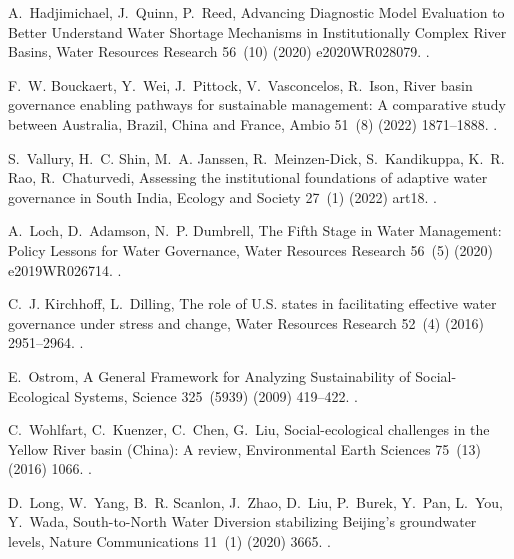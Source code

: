 \documentclass[preprint, 12pt]{elsarticle}
\begin{document}
\begin{thebibliography}{10}
A.~Hadjimichael, J.~Quinn, P.~Reed, Advancing {{Diagnostic Model Evaluation}}
  to {{Better Understand Water Shortage Mechanisms}} in {{Institutionally
  Complex River Basins}}, Water Resources Research 56~(10) (2020)
  e2020WR028079.
\newblock \href {http://dx.doi.org/10.1029/2020WR028079}
  {}.

F.~W. Bouckaert, Y.~Wei, J.~Pittock, V.~Vasconcelos, R.~Ison, River basin
  governance enabling pathways for sustainable management: {{A}} comparative
  study between {{Australia}}, {{Brazil}}, {{China}} and {{France}}, Ambio
  51~(8) (2022) 1871--1888.
\newblock \href {http://dx.doi.org/10.1007/s13280-021-01699-4}
  {}.

S.~Vallury, H.~C. Shin, M.~A. Janssen, R.~{Meinzen-Dick}, S.~Kandikuppa, K.~R.
  Rao, R.~Chaturvedi, Assessing the institutional foundations of adaptive water
  governance in {{South India}}, Ecology and Society 27~(1) (2022) art18.
\newblock \href {http://dx.doi.org/10.5751/ES-12957-270118}
  {}.

A.~Loch, D.~Adamson, N.~P. Dumbrell, The {{Fifth Stage}} in {{Water
  Management}}: {{Policy Lessons}} for {{Water Governance}}, Water Resources
  Research 56~(5) (2020) e2019WR026714.
\newblock \href {http://dx.doi.org/10.1029/2019WR026714}
  {}.

C.~J. Kirchhoff, L.~Dilling, The role of {{U}}.{{S}}. states in facilitating
  effective water governance under stress and change, Water Resources Research
  52~(4) (2016) 2951--2964.
\newblock \href {http://dx.doi.org/10.1002/2015WR018431}
  {}.

E.~Ostrom, A {{General Framework}} for {{Analyzing Sustainability}} of
  {{Social-Ecological Systems}}, Science 325~(5939) (2009) 419--422.
\newblock \href {http://dx.doi.org/10.1126/science.1172133}
  {}.

C.~Wohlfart, C.~Kuenzer, C.~Chen, G.~Liu, Social-ecological challenges in the
  {{Yellow River}} basin ({{China}}): A review, Environmental Earth Sciences
  75~(13) (2016) 1066.
\newblock \href {http://dx.doi.org/10.1007/s12665-016-5864-2}
  {}.

D.~Long, W.~Yang, B.~R. Scanlon, J.~Zhao, D.~Liu, P.~Burek, Y.~Pan, L.~You,
  Y.~Wada, South-to-{{North Water Diversion}} stabilizing {{Beijing}}'s
  groundwater levels, Nature Communications 11~(1) (2020) 3665.
\newblock \href {http://dx.doi.org/10.1038/s41467-020-17428-6}
  {}.


\end{thebibliography}
\end{document}
